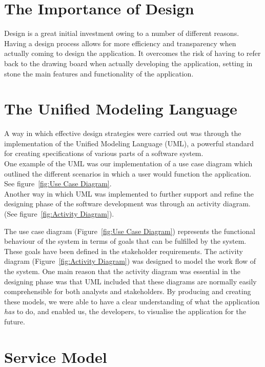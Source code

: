 \section{The Importance of Design}

Design is a great initial investment owing to a number of different reasons. Having a design process allows for more efficiency and transparency when actually coming to design the application. It overcomes the risk of having to refer back to the drawing board when actually developing the application, setting in stone the main features and functionality of the application.

\section{The Unified Modeling Language}

A way in which effective design strategies were carried out was through the implementation of the Unified Modeling Language (UML), a powerful standard for creating specifications of various parts of a software system.\\

One example of the UML was our implementation of a use case diagram which outlined the different scenarios in which a user would function the application. See figure~\ref{fig:Use Case Diagram}.\\

Another way in which UML was implemented to further support and refine the designing phase of the software development was through an activity diagram. (See figure~\ref{fig:Activity Diagram}).

The use case diagram (Figure~\ref{fig:Use Case Diagram}) represents the functional behaviour of the system in terms of goals that can be fulfilled by the system. These goals have been defined in the stakeholder requirements. The activity diagram (Figure~\ref{fig:Activity Diagram}) was designed to model the work flow of the system. One main reason that the activity diagram was essential in the designing phase was that UML included that these diagrams are normally easily comprehensible for both analysts and stakeholders. By producing and creating these models, we were able to have a clear understanding of what the application \textit{has} to do, and enabled us, the developers, to visualise the application for the future.

\section{Service Model}


